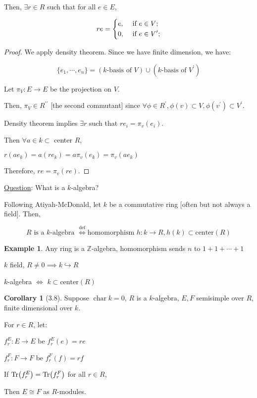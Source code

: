 \documentclass{article}
\theoremstyle{definition}
\newtheorem*{example}{Example}
\newtheorem{corollary}[theorem]{Corollary}
\newcommand{\Char}{\operatorname{char}}
\begin{document}
Then, \(\exists r\in R\) such that for all \(e \in E\),

\[
    r e = \begin{dcases}
        e, &\text{ if } e \in V ;\\
        0, &\text{ if } e\in V^{\prime}  ;
    \end{dcases}
\]

\begin{proof}
    We apply density theorem. Since we have finite dimension, we have:

    \[
        \{ e_1, \cdots , e_n \} = (k\text{-basis of } V) \cup (k\text{-basis of } V^{\prime})
    \]

    Let \(\pi_V : E \to E\) be the projection on \(V\).

    Then, \(\pi_V \in R^{\prime\prime}\) [the second commutant] since \(\forall \phi \in R^{\prime}, \phi (v) \subset V, \phi(v^{\prime}) \subset V^{\prime}\).

    Density theorem implies \(\exists r\) such that \(r e_i = \pi_v(e_i)\).

    Then \(\forall a\in k \subset \) center \(R\),

    \(r (a e_k) = a (r e_k) = a \pi_v (e_k) = \pi_v (a e_k)\) 

    Therefore, \(r e = \pi _v(re)\).
\end{proof}

\underline{Question}: What is a \(k\)-algebra?

Following Atiyah-McDonald, let \(k\) be a commutative ring [often but not always a field]. Then,

\[
    R \text{ is a } k \text{-algebra } \overset{\text{def}}{\iff} \text{homomorphism } h: k \to R, h(k) \subset \text{center}(R)
\]

\begin{example}
    Any ring is a \(\mathbb{Z}\)-algebra, homomorphism sends \(n\) to \(1+1+\cdots+1\) 

    \(k\) field, \(R \neq 0 \implies k \hookrightarrow R\)
    
    \(k\)-algebra \(\iff\) \(k \subset \text{center}(R)\) 
\end{example}

\begin{corollary}
    [3.8]

    Suppose \(\Char k = 0\), \(R\) is a \(k\)-algebra, \(E,F\) semisimple over \(R\), finite dimensional over \(k\).
    
    For \(r\in R\), let:

    \(f_r^E : E \to E\) be \(f_r^E(e)=re\) 

    \(f_r^F : F \to F\) be \(f_r^F(f)=rf\) 

    If \(\Tr(f_r^E)=\Tr(f_r^F)\) for all \(r\in R\),
    
    Then \(E \cong F\) as \(R\)-modules.
\end{corollary}
\end{document}
